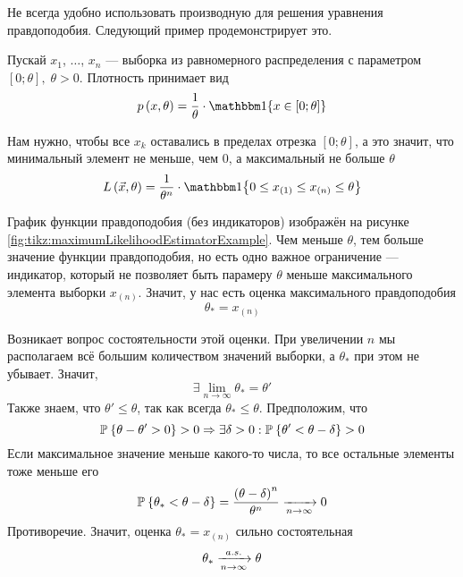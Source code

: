 Не всегда удобно использовать производную для решения уравнения правдоподобия.
Следующий пример продемонстрирует это.

\begin{example}
  Пускай $x_1$, $\dots$, $x_n$ --- выборка из равномерного распределения
  с параметром $\left[ 0; \theta \right],\; \theta > 0$.
  Плотность принимает вид
  \begin{equation*}
    \pdf{x, \theta}
    = \frac{1}{\theta} \cdot \Indicator{x \in \left[ 0; \theta \right]}
  \end{equation*}

  Нам нужно, чтобы все $x_k$ оставались в пределах отрезка
  $\left[ 0; \theta \right]$, а это значит, что минимальный элемент не меньше,
  чем $0$, а максимальный не больше $\theta$
  \begin{equation*}
    L\left( \vec{x}, \theta \right)
    = \frac{1}{\theta^n} \cdot \Indicator{0 \le x_{\left( 1 \right)}
      \le x_{\left( n \right)} \le \theta}
  \end{equation*}

  График функции правдоподобия (без индикаторов) изображён на рисунке
  \ref{fig:tikz:maximumLikelihoodEstimatorExample}.
  Чем меньше $\theta$, тем больше значение функции правдоподобия, но есть одно
  важное ограничение --- индикатор, который не позволяет быть парамеру $\theta$
  меньше максимального элемента выборки $x_{\left( n \right)}$.
  Значит, у нас есть оценка максимального правдоподобия
  \begin{equation*}
    \theta_* = x_{\left( n \right)}
  \end{equation*}

  Возникает вопрос состоятельности этой оценки.
  При увеличении $n$ мы располагаем всё большим количеством значений выборки,
  а $\theta_*$ при этом не убывает. Значит,
  \begin{equation*}
    \exists \lim_{n \to \infty} \theta_* = \theta'
  \end{equation*}
  Также знаем, что $\theta' \le \theta$, так как всегда $\theta_* \le \theta$.
  Предположим, что
  \begin{equation*}
    \mathbb{P}_{{}}\left\{ \theta - \theta' > 0 \right\} > 0
    \Rightarrow \exists \delta > 0:
      \mathbb{P}_{{}}\left\{ \theta' < \theta - \delta \right\} > 0
  \end{equation*}
  Если максимальное значение меньше какого-то числа, то все остальные элементы
  тоже меньше его
  \begin{equation*}
    \mathbb{P}_{{}}\left\{ \theta_* < \theta - \delta \right\}
    = \frac{\left( \theta - \delta \right)^n}{\theta^n} \xrightarrow[n\to\infty]{} 0
  \end{equation*}
  Противоречие. Значит, оценка $\theta_* = x_{\left( n \right)}$ сильно
  состоятельная
  \begin{equation*}
    \theta_* \xrightarrow[n\to\infty]{a.s.} \theta
  \end{equation*}
\end{example}


